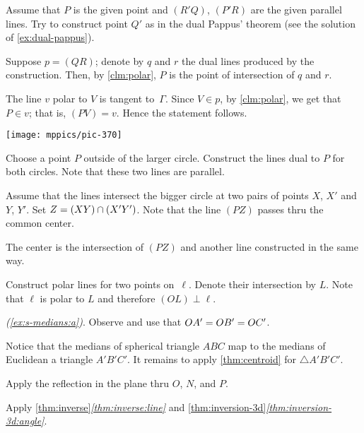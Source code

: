  Assume that $P$ is the given point and $(R'Q)$, $(P'R)$ are the given parallel lines.
Try to construct point $Q'$ as in the dual Pappus' theorem (see the solution of \ref{ex:dual-pappus}).

 Suppose $p=(QR)$; denote by $q$ and $r$ the dual lines produced by the construction.
Then, by \ref{clm:polar}, $P$ is the point of intersection of $q$ and $r$.

The line $v$ polar to $V$ is tangent to~$\Gamma$.
Since $V\in p$, by \ref{clm:polar}, we get that $P\in v$;
that is, $(PV)=v$.
Hence the statement follows.

\begin{Figure}
\vskip-0mm
\centering
\texttt{[image: mppics/pic-370]}
\vskip-6mm
\end{Figure} 

Choose a point $P$ outside of the larger circle.
Construct the lines dual to $P$ for both circles.
Note that these two lines are parallel. 

Assume that the lines intersect the bigger circle at two pairs of points $X$, $X'$ and $Y$, $Y'$.
Set $Z=(XY)\cap (X'Y')$.
Note that the line $(PZ)$ passes thru the common center.

The center is the intersection of $(PZ)$ and another line constructed in the same way.

Construct polar lines for two points on~$\ell$.
Denote their intersection by $L$.
Note that $\ell$ is polar to $L$ and therefore $(OL)\perp \ell$.

\setcounter{eqtn}{0}

\textit{(\ref{ex:s-medians:a})}.
Observe and use that 
$OA'=OB'=OC'$.

 Notice that the medians of spherical triangle $ABC$ 
map to the medians of Euclidean a triangle $A'B'C'$.
It remains to apply \ref{thm:centroid} for $\triangle A'B'C'$.

Apply the reflection in the plane thru $O$, $N$, and $P$.

Apply \ref{thm:inverse}\textit{\ref{thm:inverse:line}}
and \ref{thm:inversion-3d}\textit{\ref{thm:inversion-3d:angle}}.

